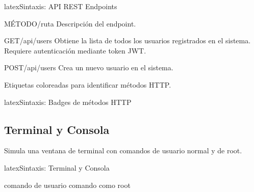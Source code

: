\begin{codigosimple}{latex}{Sintaxis: API REST Endpoints}
\begin{apiendpoint}{MÉTODO}{/ruta}
  Descripción del endpoint.

\end{apiendpoint}
\end{codigosimple}

\begin{apiendpoint}{GET}{/api/users}
  Obtiene la lista de todos los usuarios registrados en el sistema.
  Requiere autenticación mediante token JWT.



\end{apiendpoint}

\vspace{1em}

\begin{apiendpoint}{POST}{/api/users}
  Crea un nuevo usuario en el sistema.

\end{apiendpoint}

Etiquetas coloreadas para identificar métodos HTTP.

\begin{codigosimple}{latex}{Sintaxis: Badges de métodos HTTP}
\httpget \httppost \httpput \httppatch \httpdelete
\end{codigosimple}

\noindent
\httpget \quad \httppost \quad \httpput \quad \httppatch \quad \httpdelete

\subsection{Terminal y Consola}
\label{subsec:terminal}

Simula una ventana de terminal con comandos de usuario normal y de root.

\begin{codigosimple}{latex}{Sintaxis: Terminal y Consola}
\begin{terminal}
  \prompt comando de usuario
  \promptroot comando como root
\end{terminal}
\end{codigosimple}

